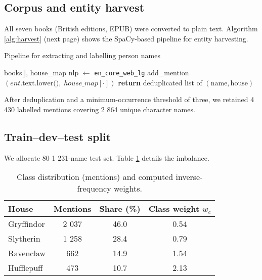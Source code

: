 \documentclass[12pt,a4paper]{article}
\begin{document}
\subsection{Corpus and entity harvest}

All seven books (British editions, EPUB) were converted to plain text.
Algorithm \ref{alg:harvest} (next page) shows the SpaCy‐based pipeline
for entity harvesting.

\begin{algorithm}[H]
  \caption{Pipeline for extracting and labelling person names}\label{alg:harvest}
  \begin{algorithmic}[1]
    \Require books[], house\_map 
    \State nlp $\gets$ \texttt{en\_core\_web\_lg}
          \State add\_mention$(ent.\text{text.lower()},\;house\_map[\cdot])$
        \EndIf
      \EndFor
    \EndFor
    \State \textbf{return} deduplicated list of $(\text{name},\text{house})$
  \end{algorithmic}
\end{algorithm}

After deduplication and a minimum-occurrence threshold of three, we
retained 4 430 labelled mentions covering 2 864 unique character names.

\subsection{Train–dev–test split}

We allocate 80 %
1 231-name test set.  Table \ref{tab:classdist} details the imbalance.

\begin{table}[H]
  \centering
  \caption{Class distribution (mentions) and computed inverse-frequency weights.}
  \label{tab:classdist}
  \begin{tabular}{@{}lccc@{}}
    \toprule
    House & Mentions & Share (\%) & Class weight \(w_c\) \\
    \midrule
    Gryffindor & 2 037 & 46.0 & 0.54 \\
    Slytherin  & 1 258 & 28.4 & 0.79 \\
    Ravenclaw  &   662 & 14.9 & 1.54 \\
    Hufflepuff &   473 & 10.7 & 2.13 \\
    \bottomrule
  \end{tabular}
\end{table}
\end{document}
